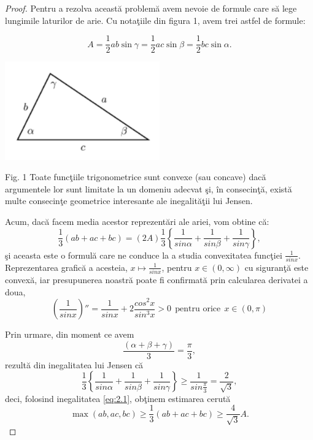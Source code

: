 \documentclass[a4paper,12pt,oneside]{report}
\begin{document}
\begin{proof}
	Pentru a rezolva aceast\u{a} problem\u{a} avem nevoie de formule care s\u{a} lege lungimile laturilor de arie. Cu nota\c{t}iile din figura 1, avem trei astfel de formule:

\begin{displaymath}
  A = \frac{1}{2}ab \sin\gamma = \frac{1}{2}ac \sin \beta = \frac{1}{2}bc \sin \alpha.
\end{displaymath}
\begin{center}
    \includegraphics[width=0.5\textwidth]{fig2.1.png}
\end{center}

Fig. 1  Toate func\c{t}iile trigonometrice sunt convexe (sau concave) dac\u{a}
argumentele lor sunt limitate la un domeniu adecvat \c{s}i, \^{i}n consecin\c{t}\u{a},
exist\u{a} multe consecin\c{t}e geometrice interesante ale inegalit\u{a}\c{t}ii lui Jensen.


Acum, dac\u{a} facem media acestor reprezent\u{a}ri ale ariei, vom obtine c\u{a}:
\begin{displaymath}
  \frac{1}{3}\left ( ab + ac + bc \right )= \left ( 2A \right )\frac{1}{3}\left \{ \frac{1}{sin \alpha } + \frac{1}{sin \beta } + \frac{1}{sin \gamma }\right \}, \label{eq:2.1} \tag{2.1}
\end{displaymath}
\c{s}i aceasta este o formul\u{a} care ne conduce la a studia convexitatea func\c{t}iei \(\frac{1}{sin x}\). Reprezentarea grafic\u{a} a acesteia, \(x \mapsto \frac{1}{sin x}\), pentru \(x\in \left ( 0, \infty  \right )\) cu siguran\c{t}\u{a} este convex\u{a}, iar presupunerea noastr\u{a} poate fi confirmat\u{a} prin calcularea derivatei a doua,
\begin{displaymath}
  {\left ( \frac{1}{sin x} \right )}''= \frac{1}{sin x} + 2\frac{cos^{2}x}{sin ^{3}x}> 0~~ \text{pentru orice}~~ x\in \left ( 0, \pi  \right )  \label{eq:2.2} \tag{2.2}
\end{displaymath}

	Prin urmare, din moment ce avem \[\frac{\left ( \alpha + \beta  + \gamma  \right )}{3}= \frac{\pi }{3},\] rezult\u{a} din inegalitatea lui Jensen c\u{a}
\begin{displaymath}
  \frac{1}{3}\left \{ \frac{1}{sin \alpha }  + \frac{1}{sin \beta } + \frac{1}{sin \gamma }\right \}\geq \frac{1}{sin \frac{\pi }{3}} =  \frac{2}{\sqrt{3}},
\end{displaymath}
deci, folosind inegalitatea \ref{eq:2.1}, ob\c{t}inem estimarea cerut\u{a}
\begin{displaymath}
 \max \left ( ab, ac, bc \right )\geq \frac{1}{3}\left ( ab + ac + bc \right )\geq \frac{4}{\sqrt{3}}A. \label{eq:2.3} \tag{2.3}
\end{displaymath}

\end{proof}
\end{document}
